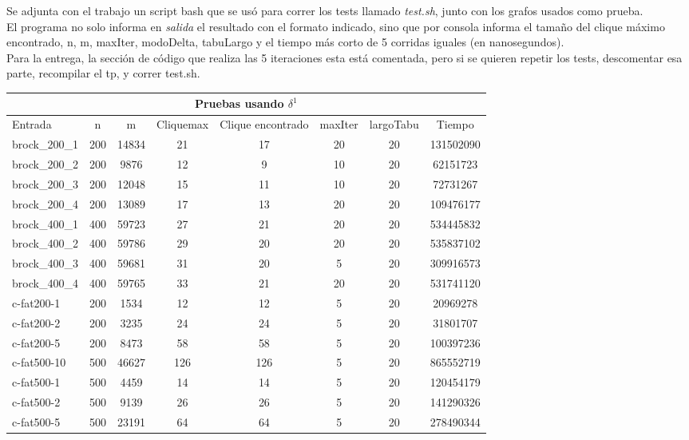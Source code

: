 Se adjunta con el trabajo un script bash que se usó para correr los tests llamado \textit{test.sh}, junto con los grafos usados como prueba. \\
El programa no solo informa en \textit{salida} el resultado con el formato indicado, sino que por consola informa el tamaño del clique máximo encontrado, n, m, maxIter, modoDelta, tabuLargo y el tiempo más corto de 5 corridas iguales (en nanosegundos).\\
Para la entrega, la sección de código que realiza las 5 iteraciones esta está comentada, pero si se quieren repetir los tests, descomentar esa parte, recompilar el tp, y correr test.sh.

\begin{tabular}{|l|c|c|c|c|c|c|c|} 
\hline \multicolumn{8}{|c|}{Pruebas usando $\delta^{1}$} \\
\hline
Entrada & n & m & Cliquemax & Clique encontrado & maxIter & largoTabu & Tiempo\\ 
\hline
brock\_200\_1 & 200 & 14834 & 21 & 17 & 20 & 20 & 131502090\\ 
\hline
brock\_200\_2 & 200 & 9876 & 12 & 9 & 10 & 20 & 62151723\\ 
\hline
brock\_200\_3 & 200 & 12048 & 15 & 11 & 10 & 20 & 72731267\\ 
\hline
brock\_200\_4 & 200 & 13089 & 17 & 13 & 20 & 20 & 109476177\\ 
\hline
brock\_400\_1 & 400 & 59723 & 27 & 21 & 20 & 20 & 534445832\\ 
\hline
brock\_400\_2 & 400 & 59786 & 29 & 20 & 20 & 20 & 535837102\\ 
\hline
brock\_400\_3 & 400 & 59681 & 31 & 20 & 5 & 20 & 309916573\\ 
\hline
brock\_400\_4 & 400 & 59765 & 33 & 21 & 20 & 20 & 531741120\\ 
\hline
c-fat200-1 & 200 & 1534 & 12 & 12 & 5 & 20 & 20969278\\ 
\hline
c-fat200-2 & 200 & 3235 & 24 & 24 & 5 & 20 & 31801707\\ 
\hline
c-fat200-5 & 200 & 8473 & 58 & 58 & 5 & 20 & 100397236\\ 
\hline
c-fat500-10 & 500 & 46627 & 126 & 126 & 5 & 20 & 865552719\\ 
\hline
c-fat500-1 & 500 & 4459 & 14 & 14 & 5 & 20 & 120454179\\ 
\hline
c-fat500-2 & 500 & 9139 & 26 & 26 & 5 & 20 & 141290326\\ 
\hline
c-fat500-5 & 500 & 23191 & 64 & 64 & 5 & 20 & 278490344\\ 

\end{tabular}
